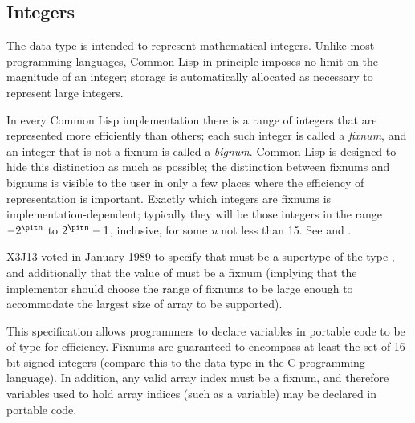 \subsection{Integers}
\label{INTEGERS-SECTION}

The  data type is intended to represent mathematical integers.
Unlike most programming languages, Common Lisp in principle imposes no limit on
the magnitude of an integer; storage
is automatically allocated as necessary to represent large integers.

In every Common Lisp implementation there is a range of integers that are
represented more efficiently than others; each such integer is called a
{\it fixnum}, and an integer that is not a fixnum is called a
{\it bignum}.
Common Lisp is designed to hide this distinction as much as possible;
the distinction between fixnums and bignums is visible to
the user in only a few places where the efficiency of representation is
important.  Exactly which integers are
fixnums is implementation-dependent; typically they will be those
integers in the range $-2^{\hbox{\scriptsize\it n}}$ to $2^{\hbox{\scriptsize\it n}}-1$,
inclusive, for some {\it n} not less than 15.
See  and .

\begin{new}
X3J13 voted in January 1989
to specify that  must be a supertype
of the type , and additionally that the value
of  must be a fixnum (implying that the implementor
should choose the range of fixnums to be large enough to accommodate the
largest size of array to be supported).

\beforenoterule
\begin{rationale}
This specification allows programmers to declare variables in portable code
to be of type  for efficiency.  Fixnums are guaranteed to
encompass at least the set of 16-bit signed integers
(compare this to the data type  in the C programming language).
In addition, any valid array index must be a fixnum, and therefore variables
used to hold array indices (such as a  variable)
may be declared  in portable code.
\end{rationale}
\afternoterule
\end{new}

